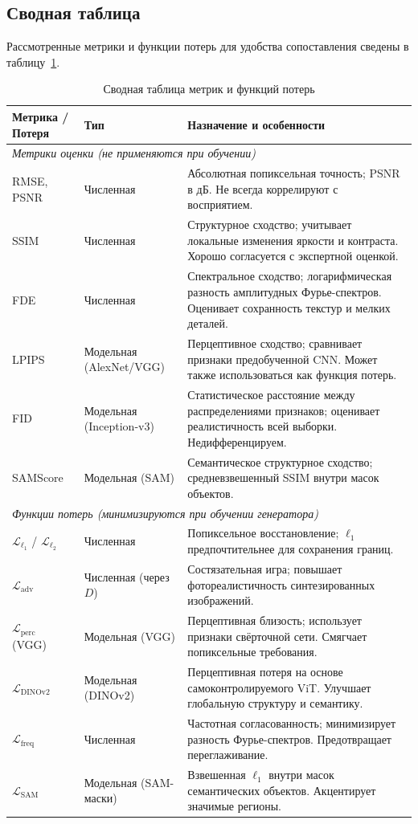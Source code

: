 \subsection{Сводная таблица}
Рассмотренные метрики и функции потерь для удобства сопоставления сведены в таблицу~\ref{tab:metrics_losses_summary}.

\begin{table}[H]
\centering
\caption{Сводная таблица метрик и функций потерь}
\label{tab:metrics_losses_summary}
\renewcommand{\arraystretch}{1.2}
\begin{tabular}{l p{2.0cm} p{7.5cm}}
\toprule
\textbf{Метрика / Потеря} & \textbf{Тип} & \textbf{Назначение и особенности} \\
\midrule
\multicolumn{3}{l}{\textit{Метрики оценки (не применяются при обучении)}} \\
\midrule
RMSE, PSNR & Численная & Абсолютная попиксельная точность; PSNR в дБ. Не всегда коррелируют с восприятием. \\
SSIM & Численная & Структурное сходство; учитывает локальные изменения яркости и контраста. Хорошо согласуется с экспертной оценкой. \\
FDE & Численная & Спектральное сходство; логарифмическая разность амплитудных Фурье-спектров. Оценивает сохранность текстур и мелких деталей. \\
LPIPS & Модельная (AlexNet/VGG) & Перцептивное сходство; сравнивает признаки предобученной CNN. Может также использоваться как функция потерь. \\
FID & Модельная (Inception-v3) & Статистическое расстояние между распределениями признаков; оценивает реалистичность всей выборки. Недифференцируем. \\
SAMScore & Модельная (SAM) & Семантическое структурное сходство; средневзвешенный SSIM внутри масок объектов. \\
\midrule
\multicolumn{3}{l}{\textit{Функции потерь (минимизируются при обучении генератора)}} \\
\midrule
\(\mathcal{L}_{\ell_1}\) / \(\mathcal{L}_{\ell_2}\) & Численная & Попиксельное восстановление; \(\ell_1\) предпочтительнее для сохранения границ. \\
\(\mathcal{L}_{\text{adv}}\) & Численная (через \(D\)) & Состязательная игра; повышает фотореалистичность синтезированных изображений. \\
\(\mathcal{L}_{\text{perc}}\) (VGG) & Модельная (VGG) & Перцептивная близость; использует признаки свёрточной сети. Смягчает попиксельные требования. \\
\(\mathcal{L}_{\text{DINOv2}}\) & Модельная (DINOv2) & Перцептивная потеря на основе самоконтролируемого ViT. Улучшает глобальную структуру и семантику. \\
\(\mathcal{L}_{\text{freq}}\) & Численная & Частотная согласованность; минимизирует разность Фурье-спектров. Предотвращает переглаживание. \\
\(\mathcal{L}_{\text{SAM}}\) & Модельная (SAM-маски) & Взвешенная \(\ell_1\) внутри масок семантических объектов. Акцентирует значимые регионы. \\
\bottomrule
\end{tabular}
\end{table}

